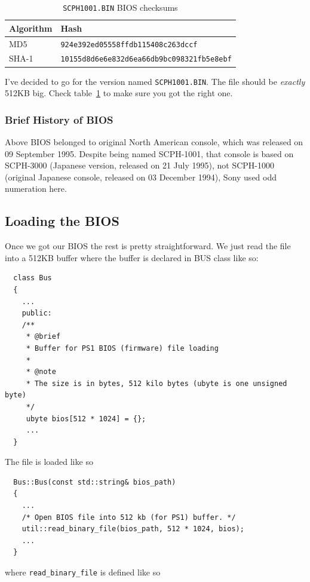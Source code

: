 \documentclass[a4paper]{article}
\newcommand{\code}[1] {\texttt{#1}}
\begin{document}
\begin{table}[ht]
  \centering

  \begin{tabular}{ l | l }
    Algorithm & Hash \\
    \hline
    MD5    & \code{924e392ed05558ffdb115408c263dccf} \\
    SHA-1   & \code{10155d8d6e6e832d6ea66db9bc098321fb5e8ebf} \\
  \end{tabular}

  \caption{\code{SCPH1001.BIN} BIOS checksums}
  \label{tab:checksums}
\end{table}

I've decided to go for the version named \code{SCPH1001.BIN}. The file
should be \emph{exactly} 512KB big. Check table~\ref{tab:checksums} to make
sure you got the right one.

\subsubsection{Brief History of BIOS}
Above BIOS belonged to original North American console, which was released on 09 September 1995. Despite being named SCPH-1001, that console is based on SCPH-3000 (Japanese version, released on 21 July 1995), not SCPH-1000 (original Japanese console, released on 03 December 1994), Sony used odd numeration here.

\subsection{Loading the BIOS}

Once we got our BIOS the rest is pretty straightforward. We just read
the file into a 512KB buffer where the buffer is declared in BUS class like
so:

\begin{lstlisting}
  class Bus
  {
    ...
    public:
    /**
     * @brief
     * Buffer for PS1 BIOS (firmware) file loading
     *
     * @note
     * The size is in bytes, 512 kilo bytes (ubyte is one unsigned byte)
     */
     ubyte bios[512 * 1024] = {};
     ...
  }
\end{lstlisting}

The file is loaded like so
\begin{lstlisting}
  Bus::Bus(const std::string& bios_path)
  {
    ...
    /* Open BIOS file into 512 kb (for PS1) buffer. */
    util::read_binary_file(bios_path, 512 * 1024, bios);
    ...
  }
\end{lstlisting}
where \code{read\_binary\_file} is defined like so
\end{document}
